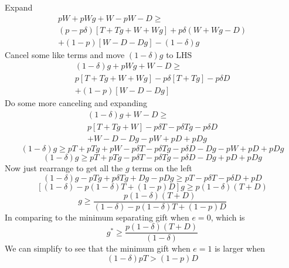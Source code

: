 \documentclass[12pt]{article}
\newcommand{\de}{\delta}
\begin{document}
Expand
\begin{multline*}
  pW + pWg + W - pW - D \geq \\
	\left(p-p\de \right) \left[T+Tg + W+Wg \right] + p\de \left(W+Wg - D\right) \\ + (1-p) \left[W - D -Dg\right] - \left(1-\de \right) g
\end{multline*}
Cancel some like terms and move $\left(1-\de \right) g$ to LHS
\begin{multline*}
  \left(1-\de \right) g + pWg + W - D \geq \\
	p\left[T+Tg + W+Wg \right] -p\de \left[T+Tg \right] - p\de D \\ + (1-p) \left[W - D -Dg\right] 
\end{multline*}
Do some more canceling and expanding
\begin{multline*}
  \left(1-\de \right) g + W - D \geq \\
	p\left[T+Tg + W\right] -p\de T -p\de Tg - p\de D \\ + W - D -Dg -pW +pD +pDg
\end{multline*}
\[
  \left(1-\de \right) g \geq 
	pT+pTg + pW -p\de T -p\de Tg - p\de D  -Dg -pW +pD +pDg
\]
\[
  \left(1-\de \right) g \geq pT+pTg -p\de T -p\de Tg - p\de D  -Dg +pD +pDg
\]
Now just rearrange to get all the $g$ terms on the left
\[
  \left(1-\de \right) g -pTg + p\de Tg + Dg - pDg\geq pT -p\de T - p\de D +pD
\]
\[
  \left[\left(1-\de \right) -p(1-\de)T +(1-p)D\right]g \geq p(1-\de)(T + D)
\]
\[
  g \geq \frac{p(1-\de)(T + D)}{\left(1-\de \right) -p(1-\de)T +(1-p)D}
\]
In comparing to the minimum separating gift when $e=0$, which is
\[
  g^* \geq \frac{p(1-\de)(T + D)}{\left(1-\de \right)}
\]
We can simplify to see that the minimum gift when $e=1$ is larger when
\[
  (1-\de)pT > (1-p)D
\]
\end{document}
